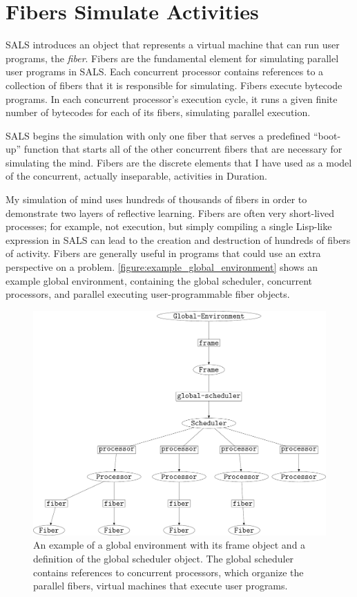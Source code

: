\section{Fibers Simulate Activities}

SALS introduces an object that represents a virtual machine that can
run user programs, the \emph{fiber}.  Fibers are the fundamental
element for simulating parallel user programs in SALS.  Each
concurrent processor contains references to a collection of fibers
that it is responsible for simulating.  Fibers execute bytecode
programs.  In each concurrent processor's execution cycle, it runs a
given finite number of bytecodes for each of its fibers, simulating
parallel execution.

SALS begins the simulation with only one fiber that serves a
predefined ``boot-up'' function that starts all of the other
concurrent fibers that are necessary for simulating the mind.  Fibers
are the discrete elements that I have used as a model of the
concurrent, actually inseparable, activities in Duration.

My simulation of mind uses hundreds of thousands of fibers in order to
demonstrate two layers of reflective learning.  Fibers are often very
short-lived processes; for example, not execution, but simply
compiling a single Lisp-like expression in SALS can lead to the
creation and destruction of hundreds of fibers of activity.  Fibers
are generally useful in programs that could use an extra perspective
on a problem.  {\mbox{\autoref{figure:example_global_environment}}}
shows an example global environment, containing the global scheduler,
concurrent processors, and parallel executing user-programmable fiber
objects.
\begin{figure}
\center
\includegraphics[width=12cm]{gfx/example_global_environment}
\caption[An example of a global environment with concurrent processors
  and parallel fibers.]{An example of a global environment with its
  frame object and a definition of the global scheduler object.  The
  global scheduler contains references to concurrent processors, which
  organize the parallel fibers, virtual machines that execute user
  programs.}
\label{figure:example_global_environment}
\end{figure}

